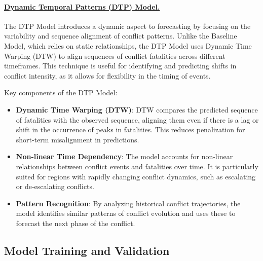 \documentclass[twocolumn]{erdc}
\begin{document}
\paragraph*{\underline{Dynamic Temporal Patterns (DTP) Model.}} The DTP Model introduces a dynamic aspect to forecasting by focusing on the variability and sequence alignment of conflict patterns. Unlike the Baseline Model, which relies on static relationships, the DTP Model uses Dynamic Time Warping (DTW) to align sequences of conflict fatalities across different timeframes. This technique is useful for identifying and predicting shifts in conflict intensity, as it allows for flexibility in the timing of events.

Key components of the DTP Model:
\begin{itemize}
    \item \textbf{Dynamic Time Warping (DTW)}: DTW compares the predicted sequence of fatalities with the observed sequence, aligning them even if there is a lag or shift in the occurrence of peaks in fatalities. This reduces penalization for short-term misalignment in predictions.
    \item \textbf{Non-linear Time Dependency}: The model accounts for non-linear relationships between conflict events and fatalities over time. It is particularly suited for regions with rapidly changing conflict dynamics, such as escalating or de-escalating conflicts.
    \item \textbf{Pattern Recognition}: By analyzing historical conflict trajectories, the model identifies similar patterns of conflict evolution and uses these to forecast the next phase of the conflict.
\end{itemize}

\subsection*{Model Training and Validation}
\end{document}
